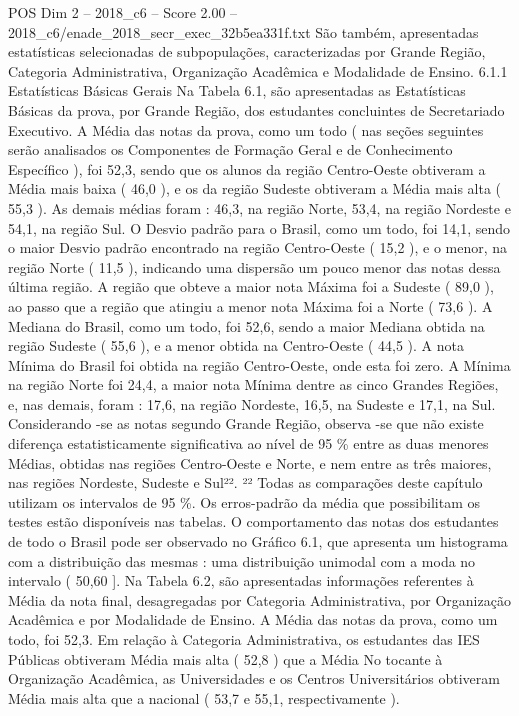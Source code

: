 \begin{textsample}{POS Dim 2 – 2018\_c6 – Score 2.00 – 2018\_c6/enade\_2018\_secr\_exec\_32b5ea331f.txt}
São também, apresentadas estatísticas selecionadas de subpopulações, caracterizadas por Grande Região, Categoria Administrativa, Organização Acadêmica e Modalidade de Ensino. 6.1.1 Estatísticas Básicas Gerais Na Tabela 6.1, são apresentadas as Estatísticas Básicas da prova, por Grande Região, dos estudantes concluintes de Secretariado Executivo.
A Média das notas da prova, como um todo ( nas seções seguintes serão analisados os Componentes de Formação Geral e de Conhecimento Específico ), foi 52,3, sendo que os alunos da região Centro-Oeste obtiveram a Média mais baixa ( 46,0 ), e os da região Sudeste obtiveram a Média mais alta ( 55,3 ).
As demais médias foram : 46,3, na região Norte, 53,4, na região Nordeste e 54,1, na região Sul.
O Desvio padrão para o Brasil, como um todo, foi 14,1, sendo o maior Desvio padrão encontrado na região Centro-Oeste ( 15,2 ), e o menor, na região Norte ( 11,5 ), indicando uma dispersão um pouco menor das notas dessa última região.
A região que obteve a maior nota Máxima foi a Sudeste ( 89,0 ), ao passo que a região que atingiu a menor nota Máxima foi a Norte ( 73,6 ).
A Mediana do Brasil, como um todo, foi 52,6, sendo a maior Mediana obtida na região Sudeste ( 55,6 ), e a menor obtida na Centro-Oeste ( 44,5 ).
A nota Mínima do Brasil foi obtida na região Centro-Oeste, onde esta foi zero.
A Mínima na região Norte foi 24,4, a maior nota Mínima dentre as cinco Grandes Regiões, e, nas demais, foram : 17,6, na região Nordeste, 16,5, na Sudeste e 17,1, na Sul.
Considerando -se as notas segundo Grande Região, observa -se que não existe diferença estatisticamente significativa ao nível de 95 \% entre as duas menores Médias, obtidas nas regiões Centro-Oeste e Norte, e nem entre as três maiores, nas regiões Nordeste, Sudeste e Sul²². ²² Todas as comparações deste capítulo utilizam os intervalos de 95 \%.
Os erros-padrão da média que possibilitam os testes estão disponíveis nas tabelas.
O comportamento das notas dos estudantes de todo o Brasil pode ser observado no Gráfico 6.1, que apresenta um histograma com a distribuição das mesmas : uma distribuição unimodal com a moda no intervalo ( 50,60 ].
Na Tabela 6.2, são apresentadas informações referentes à Média da nota final, desagregadas por Categoria Administrativa, por Organização Acadêmica e por Modalidade de Ensino.
A Média das notas da prova, como um todo, foi 52,3.
Em relação à Categoria Administrativa, os estudantes das IES Públicas obtiveram Média mais alta ( 52,8 ) que a Média No tocante à Organização Acadêmica, as Universidades e os Centros Universitários obtiveram Média mais alta que a nacional ( 53,7 e 55,1, respectivamente ).

\end{textsample}
